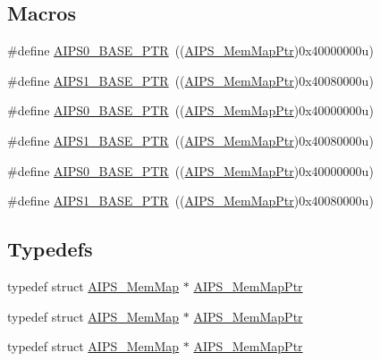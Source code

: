 \subsection*{Macros}
\begin{DoxyCompactItemize}
\item 
\#define \hyperlink{group___a_i_p_s___peripheral_ga6affb22d1dff0d01c843913f33f1c1a9}{A\+I\+P\+S0\+\_\+\+B\+A\+S\+E\+\_\+\+P\+TR}~((\hyperlink{group___a_i_p_s___peripheral_ga6a37456f1049f1d08787b6ffe1c8a9b3}{A\+I\+P\+S\+\_\+\+Mem\+Map\+Ptr})0x40000000u)
\item 
\#define \hyperlink{group___a_i_p_s___peripheral_gab38278851053aa66f9683ed8707e23bc}{A\+I\+P\+S1\+\_\+\+B\+A\+S\+E\+\_\+\+P\+TR}~((\hyperlink{group___a_i_p_s___peripheral_ga6a37456f1049f1d08787b6ffe1c8a9b3}{A\+I\+P\+S\+\_\+\+Mem\+Map\+Ptr})0x40080000u)
\item 
\#define \hyperlink{group___a_i_p_s___peripheral_ga6affb22d1dff0d01c843913f33f1c1a9}{A\+I\+P\+S0\+\_\+\+B\+A\+S\+E\+\_\+\+P\+TR}~((\hyperlink{group___a_i_p_s___peripheral_ga6a37456f1049f1d08787b6ffe1c8a9b3}{A\+I\+P\+S\+\_\+\+Mem\+Map\+Ptr})0x40000000u)
\item 
\#define \hyperlink{group___a_i_p_s___peripheral_gab38278851053aa66f9683ed8707e23bc}{A\+I\+P\+S1\+\_\+\+B\+A\+S\+E\+\_\+\+P\+TR}~((\hyperlink{group___a_i_p_s___peripheral_ga6a37456f1049f1d08787b6ffe1c8a9b3}{A\+I\+P\+S\+\_\+\+Mem\+Map\+Ptr})0x40080000u)
\item 
\#define \hyperlink{group___a_i_p_s___peripheral_ga6affb22d1dff0d01c843913f33f1c1a9}{A\+I\+P\+S0\+\_\+\+B\+A\+S\+E\+\_\+\+P\+TR}~((\hyperlink{group___a_i_p_s___peripheral_ga6a37456f1049f1d08787b6ffe1c8a9b3}{A\+I\+P\+S\+\_\+\+Mem\+Map\+Ptr})0x40000000u)
\item 
\#define \hyperlink{group___a_i_p_s___peripheral_gab38278851053aa66f9683ed8707e23bc}{A\+I\+P\+S1\+\_\+\+B\+A\+S\+E\+\_\+\+P\+TR}~((\hyperlink{group___a_i_p_s___peripheral_ga6a37456f1049f1d08787b6ffe1c8a9b3}{A\+I\+P\+S\+\_\+\+Mem\+Map\+Ptr})0x40080000u)
\end{DoxyCompactItemize}
\subsection*{Typedefs}
\begin{DoxyCompactItemize}
\item 
typedef struct \hyperlink{struct_a_i_p_s___mem_map}{A\+I\+P\+S\+\_\+\+Mem\+Map} $\ast$ \hyperlink{group___a_i_p_s___peripheral_ga6a37456f1049f1d08787b6ffe1c8a9b3}{A\+I\+P\+S\+\_\+\+Mem\+Map\+Ptr}
\item 
typedef struct \hyperlink{struct_a_i_p_s___mem_map}{A\+I\+P\+S\+\_\+\+Mem\+Map} $\ast$ \hyperlink{group___a_i_p_s___peripheral_ga6a37456f1049f1d08787b6ffe1c8a9b3}{A\+I\+P\+S\+\_\+\+Mem\+Map\+Ptr}
\item 
typedef struct \hyperlink{struct_a_i_p_s___mem_map}{A\+I\+P\+S\+\_\+\+Mem\+Map} $\ast$ \hyperlink{group___a_i_p_s___peripheral_ga6a37456f1049f1d08787b6ffe1c8a9b3}{A\+I\+P\+S\+\_\+\+Mem\+Map\+Ptr}
\end{DoxyCompactItemize}


